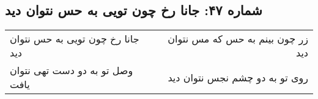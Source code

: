 \begin{center}
\section*{شماره ۴۷: جانا رخ چون تویی به حس نتوان دید}
\label{sec:047}
\begin{longtable}{l p{0.5cm} r}
جانا رخ چون تویی به حس نتوان دید
&&
زر چون بینم به حس که مس نتوان دید
\\
وصل تو به دو دست تهی نتوان یافت
&&
روی تو به دو چشم نجس نتوان دید
\\
\end{longtable}
\end{center}
